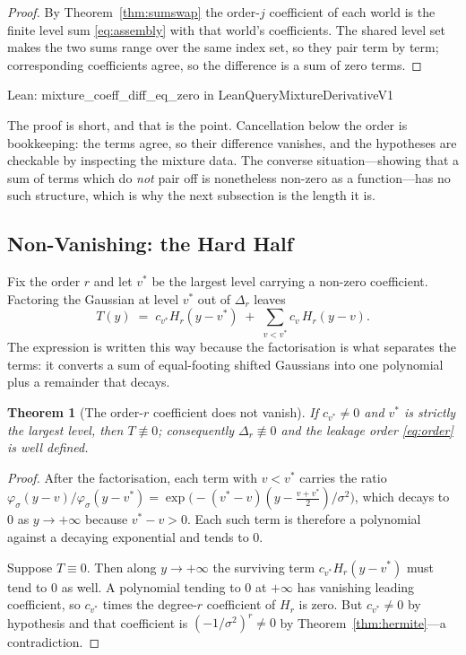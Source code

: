 \documentclass[conference]{IEEEtran}
\newtheorem{theorem}{Theorem}
\theoremstyle{definition}
\newcommand{\lean}[1]{\textsf{\footnotesize #1}}
\newcommand{\leanbox}[1]{%
  \par\vspace{2pt}\noindent
  {\footnotesize\textsf{Lean: #1}}\par\vspace{2pt}}
\begin{document}
\begin{proof}
By Theorem~\ref{thm:sumswap} the order-$j$ coefficient of each world is the finite level sum
\eqref{eq:assembly} with that world's coefficients. The shared level set makes the two sums
range over the same index set, so they pair term by term; corresponding coefficients agree,
so the difference is a sum of zero terms.
\end{proof}

\leanbox{\lean{mixture\_coeff\_diff\_eq\_zero} in \lean{LeanQueryMixtureDerivativeV1}}

The proof is short, and that is the point. Cancellation below the order is bookkeeping: the
terms agree, so their difference vanishes, and the hypotheses are checkable by inspecting
the mixture data. The converse situation---showing that a sum of terms which do \emph{not}
pair off is nonetheless non-zero as a function---has no such structure, which is why the next
subsection is the length it is.

\subsection{Non-Vanishing: the Hard Half}
\label{sec:nonvanish}

Fix the order $r$ and let $v^{*}$ be the largest level carrying a non-zero coefficient.
Factoring the Gaussian at level $v^{*}$ out of $\Delta_{r}$ leaves
\begin{equation}
T(y)\;=\;c_{v^{*}}H_{r}(y-v^{*})\;+\;\sum_{v<v^{*}}c_{v}\,H_{r}(y-v).
\label{eq:nonvanish}
\end{equation}
The expression is written this way because the factorisation is what separates the terms: it
converts a sum of equal-footing shifted Gaussians into one polynomial plus a remainder that
decays.

\begin{theorem}[The order-$r$ coefficient does not vanish]
\label{thm:nonvanish}
If $c_{v^{*}}\neq0$ and $v^{*}$ is strictly the largest level, then $T\not\equiv0$;
consequently $\Delta_{r}\not\equiv0$ and the leakage order \eqref{eq:order} is well defined.
\end{theorem}

\begin{proof}
After the factorisation, each term with $v<v^{*}$ carries the ratio
$\varphi_{\sigma}(y-v)/\varphi_{\sigma}(y-v^{*})
=\exp\bigl(-(v^{*}-v)(y-\tfrac{v+v^{*}}{2})/\sigma^{2}\bigr)$, which decays to $0$ as
$y\to+\infty$ because $v^{*}-v>0$. Each such term is therefore a polynomial against a
decaying exponential and tends to $0$.

Suppose $T\equiv0$. Then along $y\to+\infty$ the surviving term $c_{v^{*}}H_{r}(y-v^{*})$
must tend to $0$ as well. A polynomial tending to $0$ at $+\infty$ has vanishing leading
coefficient, so $c_{v^{*}}$ times the degree-$r$ coefficient of $H_{r}$ is zero. But
$c_{v^{*}}\neq0$ by hypothesis and that coefficient is $(-1/\sigma^{2})^{r}\neq0$ by
Theorem~\ref{thm:hermite}---a contradiction.
\end{proof}
\end{document}
